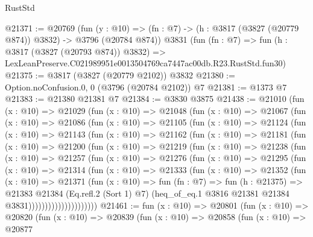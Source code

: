 \begin{lexlean}{RustStd}
\begin{coremodule}
@21371 := @20769
    (fun (y : @10) => (fn : @7) -> (h : @3817 (@3827 (@20779 @874)) @3832) -> @3796 (@20784 @874))
    @3831
    (fun (fn : @7) =>
    fun (h : @3817 (@3827 (@20793 @874)) @3832) =>
    LexLeanPreserve.C021989951e0013504769ca7447ac00db.R23.RustStd.fun30)
@21375 := @3817 (@3827 (@20779 @2102)) @3832
@21380 := Option.noConfusion.{0, 0} (@3796 (@20784 @2102)) @7
@21381 := @1373 @7
@21383 := @21380 @21381 @7
@21384 := @3830 @3875
@21438 := @21010
    (fun (x : @10) =>
    @21029
      (fun (x : @10) =>
      @21048
        (fun (x : @10) =>
        @21067
          (fun (x : @10) =>
          @21086
            (fun (x : @10) =>
            @21105
              (fun (x : @10) =>
              @21124
                (fun (x : @10) =>
                @21143
                  (fun (x : @10) =>
                  @21162
                    (fun (x : @10) =>
                    @21181
                      (fun (x : @10) =>
                      @21200
                        (fun (x : @10) =>
                        @21219
                          (fun (x : @10) =>
                          @21238
                            (fun (x : @10) =>
                            @21257
                              (fun (x : @10) =>
                              @21276
                                (fun (x : @10) =>
                                @21295
                                  (fun (x : @10) =>
                                  @21314
                                    (fun (x : @10) =>
                                    @21333
                                      (fun (x : @10) =>
                                      @21352
                                        (fun (x : @10) =>
                                        @21371
                                          (fun (x : @10) =>
                                          fun (fn : @7) =>
                                          fun (h : @21375) =>
                                          @21383
                                            @21384
                                            (Eq.refl.{2} (Sort 1) @7)
                                            (heq_of_eq.{1}
                                              @3816
                                              @21381
                                              @21384
                                              @3831)))))))))))))))))))))
@21461 := fun (x : @10) =>
  @20801
    (fun (x : @10) =>
    @20820
      (fun (x : @10) =>
      @20839
        (fun (x : @10) =>
        @20858
          (fun (x : @10) =>
          @20877

\end{coremodule}
\end{lexlean}
